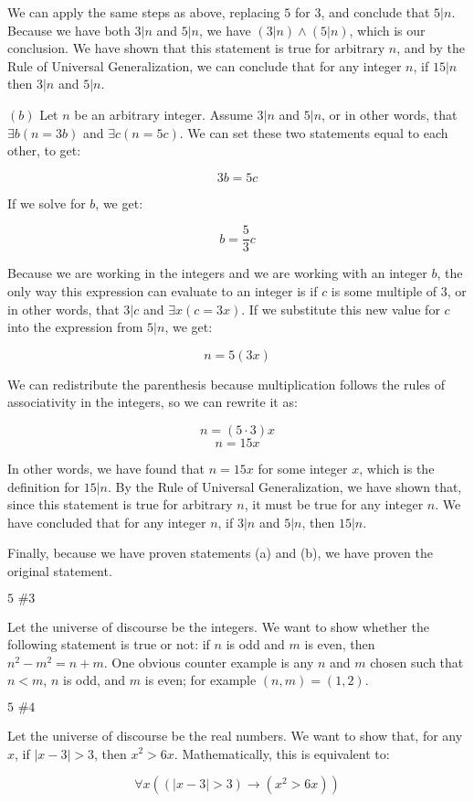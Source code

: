 \documentclass{article}
\newcommand{\problem}[2]{$\boxed{\text{#1 \##2}}$}
\newcommand{\subproblem}[1]{$\boxed{(#1)}$}
\newcommand{\RUG}{Rule of Universal Generalization}
\begin{document}
\begin{multicols*}{2}
We can apply the same steps as above, replacing $5$ for $3$, and
conclude that $5|n$. Because we have both $3|n$ and $5|n$, we have
$(3|n)\wedge(5|n)$, which is our conclusion. We have shown that this
statement is true for arbitrary $n$, and by the \RUG, we can conclude
that for any integer $n$, if $15|n$ then $3|n$ and $5|n$.

\subproblem{b} Let $n$ be an arbitrary integer. Assume $3|n$ and
$5|n$, or in other words, that $\exists{}b(n=3b)$ and
$\exists{}c(n=5c)$. We can set these two statements equal to each
other, to get:

\[
3b=5c
\]

If we solve for $b$, we get:

\[
b=\frac{5}{3}c
\]

Because we are working in the integers and we are working with an
integer $b$, the only way this expression can evaluate to an integer
is if $c$ is some multiple of $3$, or in other words, that $3|c$ and
$\exists{}x(c=3x)$. If we substitute this new value for $c$ into the
expression from $5|n$, we get:

\[
n=5(3x)
\]

We can redistribute the parenthesis because multiplication follows the
rules of associativity in the integers, so we can rewrite it as:

\[
n=(5\cdot 3)x
\] \[
n=15x
\]

In other words, we have found that $n=15x$ for some integer $x$, which
is the definition for $15|n$. By the \RUG, we have shown that, since
this statement is true for arbitrary $n$, it must be true for any
integer $n$. We have concluded that for any integer $n$, if $3|n$ and
$5|n$, then $15|n$.

Finally, because we have proven statements (a) and (b), we have proven
the original statement.

\problem{5}{3}

Let the universe of discourse be the integers. We want to show whether
the following statement is true or not: if $n$ is odd and $m$ is even,
then $n^2-m^2=n+m$. One obvious counter example is any $n$ and $m$
chosen such that $n<m$, $n$ is odd, and $m$ is even; for example
$(n,m)=(1,2)$.

\problem{5}{4}

Let the universe of discourse be the real numbers. We want to show
that, for any $x$, if $|x-3|>3$, then $x^2>6x$. Mathematically, this
is equivalent to:

\[
\forall x((|x-3|>3)\rightarrow(x^2>6x))
\]


\end{multicols*}
\end{document}
